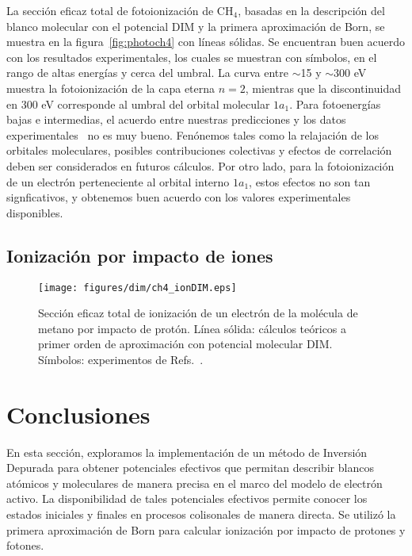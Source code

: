 La sección eficaz total de fotoionización de CH$_4$, basadas en la 
descripción del blanco molecular con el potencial DIM y la primera 
aproximación de Born, se muestra en la figura~\ref{fig:photoch4} con 
líneas sólidas. Se encuentran buen acuerdo con los resultados 
experimentales, los cuales se muestran con símbolos, en el rango de
altas energías y cerca del umbral. La curva entre $\sim$15 y 
$\sim$300 eV muestra la fotoionización de la capa eterna $n=2$, mientras
que la discontinuidad en 300 eV corresponde al umbral del orbital 
molecular $1a_1$. Para fotoenergías bajas e intermedias, el acuerdo entre 
nuestras predicciones y los datos 
experimentales~\cite{Lukirskii:64,Henke:82,Samson:89} no es muy bueno.
Fenónemos tales como la relajación de los orbitales moleculares, posibles
contribuciones colectivas y efectos de correlación deben ser considerados 
en futuros cálculos. Por otro lado, para la fotoionización de un electrón
perteneciente al orbital interno $1a_1$, estos efectos no son tan 
signficativos, y obtenemos buen acuerdo con los valores experimentales
disponibles.

\subsection{Ionización por impacto de iones}
\label{subsec:dimion}

\begin{figure}
\centering
 \texttt{[image: figures/dim/ch4\_ionDIM.eps]}
\caption[Ionización de metano por impacto de protón.]
{Sección eficaz total de ionización de un electrón de la
molécula de metano por impacto de protón. Línea sólida: cálculos 
teóricos a primer orden de aproximación con potencial molecular DIM. 
Símbolos: experimentos de Refs.~\cite{Rudd:83,Rudd:85}.}
\label{fig:ionch4}
\end{figure}

\newpage
\section{Conclusiones}
\label{conclusion}

En esta sección, exploramos la implementación de un método de Inversión
Depurada para obtener potenciales efectivos que permitan describir
blancos atómicos y moleculares de manera precisa en el marco del modelo 
de electrón activo. La disponibilidad de tales potenciales efectivos 
permite conocer los estados iniciales y finales en procesos colisonales 
de manera directa. Se utilizó la primera aproximación de Born para 
calcular ionización por impacto de protones y fotones. 

